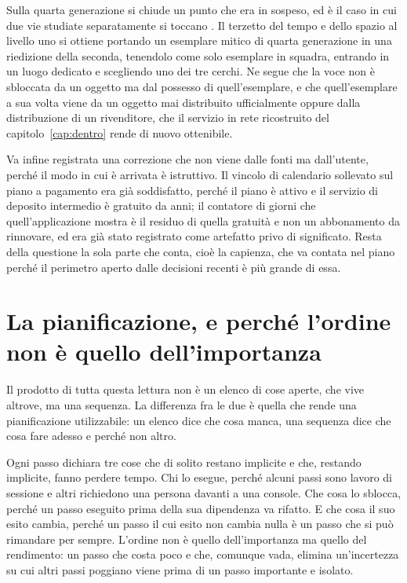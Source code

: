 Sulla quarta generazione si chiude un punto che era in sospeso, ed è il caso in cui due vie studiate separatamente si toccano \cite{sinjoh-ruins}. Il terzetto del tempo e dello spazio al livello uno si ottiene portando un esemplare mitico di quarta generazione in una riedizione della seconda, tenendolo come solo esemplare in squadra, entrando in un luogo dedicato e scegliendo uno dei tre cerchi. Ne segue che la voce non è sbloccata da un oggetto ma dal possesso di quell'esemplare, e che quell'esemplare a sua volta viene da un oggetto mai distribuito ufficialmente oppure dalla distribuzione di un rivenditore, che il servizio in rete ricostruito del capitolo~\ref{cap:dentro} rende di nuovo ottenibile.

Va infine registrata una correzione che non viene dalle fonti ma dall'utente, perché il modo in cui è arrivata è istruttivo. Il vincolo di calendario sollevato sul piano a pagamento era già soddisfatto, perché il piano è attivo e il servizio di deposito intermedio è gratuito da anni; il contatore di giorni che quell'applicazione mostra è il residuo di quella gratuità e non un abbonamento da rinnovare, ed era già stato registrato come artefatto privo di significato. Resta della questione la sola parte che conta, cioè la capienza, che va contata nel piano perché il perimetro aperto dalle decisioni recenti è più grande di essa.

\section{La pianificazione, e perché l'ordine non è quello dell'importanza}

Il prodotto di tutta questa lettura non è un elenco di cose aperte, che vive altrove, ma una sequenza. La differenza fra le due è quella che rende una pianificazione utilizzabile: un elenco dice che cosa manca, una sequenza dice che cosa fare adesso e perché non altro.

Ogni passo dichiara tre cose che di solito restano implicite e che, restando implicite, fanno perdere tempo. Chi lo esegue, perché alcuni passi sono lavoro di sessione e altri richiedono una persona davanti a una console. Che cosa lo sblocca, perché un passo eseguito prima della sua dipendenza va rifatto. E che cosa il suo esito cambia, perché un passo il cui esito non cambia nulla è un passo che si può rimandare per sempre. L'ordine non è quello dell'importanza ma quello del rendimento: un passo che costa poco e che, comunque vada, elimina un'incertezza su cui altri passi poggiano viene prima di un passo importante e isolato.

